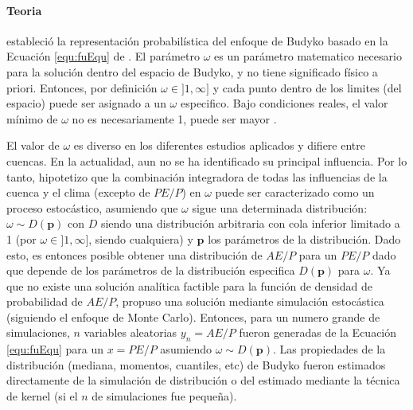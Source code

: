 \documentclass[12pt]{article}
\begin{document}
\paragraph{Teoria}\mbox{}

\citet{Greve2015} estableció la representación probabilística del enfoque de Budyko basado en la Ecuación \ref{equ:fuEqu} de \citet{Fu1981}. El parámetro $\omega$ es un parámetro matematico necesario para la solución dentro del espacio de Budyko, y no tiene significado físico a priori. Entonces, por definición $\omega \in]1,\infty ]$ y cada punto dentro de los limites (del espacio) puede ser asignado a un $\omega$ especifico. Bajo condiciones reales, el valor mínimo de $\omega$ no es necesariamente 1, puede ser mayor \citet{Zhang2004}. 

El valor de $\omega$ es diverso en los diferentes estudios aplicados y difiere entre cuencas. En la actualidad, aun no se ha identificado su principal influencia. Por lo tanto, \citet{Greve2015} hipotetizo que la combinación integradora de todas las influencias de la cuenca y el clima (excepto de $PE/P$) en $\omega$ puede ser caracterizado como un proceso estocástico, asumiendo que $\omega$ sigue una determinada distribución: $\omega \sim D(\textbf{p})$ con $D$ siendo una distribución arbitraria con cola inferior limitado a 1 (por $\omega \in]1,\infty ]$, siendo cualquiera) y $\textbf{p}$ los parámetros de la distribución. Dado esto, es entonces posible obtener una distribución de $AE/P$ para un $PE/P$ dado que depende de los parámetros de la distribución especifica $D(\textbf{p})$ para $\omega$. 
Ya que no existe una solución analítica factible para la función de densidad de probabilidad de $AE/P$, \citet{Greve2015} propuso una solución mediante simulación estocástica (siguiendo el enfoque de Monte Carlo). Entonces, para un numero grande de simulaciones, $n$ variables aleatorias $y_{n} = AE/P$ fueron generadas de la Ecuación \ref{equ:fuEqu} para un $x = PE/P$ asumiendo $\omega \sim D(\textbf{p})$. Las propiedades de la distribución (mediana, momentos, cuantiles, etc) de Budyko fueron estimados directamente de la simulación de distribución o del estimado mediante la técnica de kernel (si el $n$ de simulaciones fue pequeña).


\end{document}
